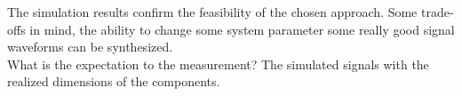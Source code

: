 
The simulation results confirm the feasibility of the chosen approach.
Some trade-offs in mind, the ability to change some system parameter some really good signal waveforms can be synthesized.
\\
What is the expectation to the measurement? 
The simulated signals with the realized dimensions of the components.
